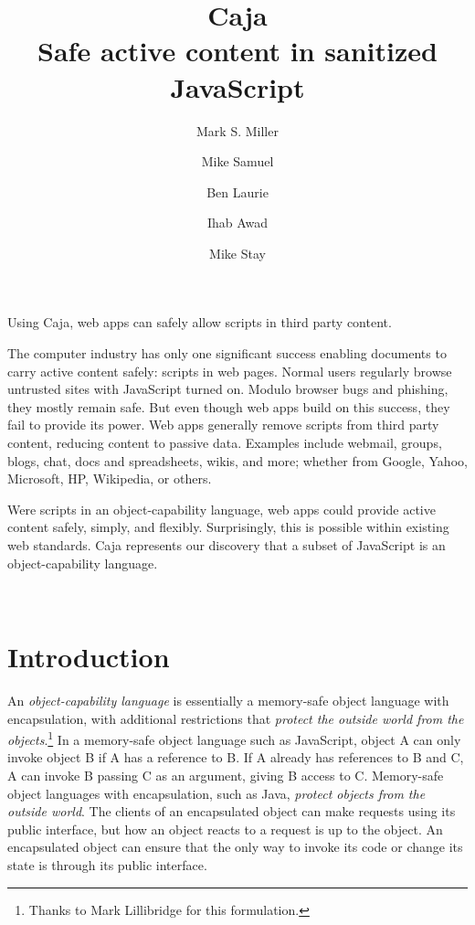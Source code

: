 \documentclass[letterpaper,twocolumn,10pt]{article}
\title{Caja\\
Safe active content in sanitized JavaScript}
\author{
        {\rm Mark S. Miller}
        \and 
        {\rm Mike Samuel}
        \and 
        {\rm Ben Laurie}
        \and 
        {\rm Ihab Awad}
        \and 
        {\rm Mike Stay}}
\begin{document}
\listoftodos

\maketitle


\abstract

Using Caja, web apps can safely allow scripts in third party content.

The computer industry has only one significant success enabling documents to 
carry active content safely: scripts in web pages. Normal users regularly 
browse untrusted sites with JavaScript turned on. Modulo browser bugs and 
phishing, they mostly remain safe. But even though web apps build on this 
success, they fail to provide its power. Web apps generally remove scripts 
from third party content, reducing content to passive data. Examples include 
webmail, groups, blogs, chat, docs and spreadsheets, wikis, and more; whether 
from Google, Yahoo, Microsoft, HP, Wikipedia, or others.

Were scripts in an object-capability language, web apps could provide active 
content safely, simply, and flexibly. Surprisingly, this is possible within 
existing web standards. Caja represents our discovery that a subset of 
JavaScript is an object-capability language.

\ \\

\section{Introduction}

An \emph{object-capability language} is essentially a memory-safe object 
language with encapsulation, with additional restrictions that \emph{protect 
the outside world from the objects}.\footnote{
%
Thanks to Mark Lillibridge for this formulation.
%
}  In a memory-safe object language such as JavaScript, object A can only invoke 
object B if A has a reference to B. If A already has references to B and C, A 
can invoke B passing C as an argument, giving B access to C. Memory-safe 
object languages with encapsulation, such as Java, \emph{protect objects from 
the outside world}. The clients of an encapsulated object can make requests 
using its public interface, but how an object reacts to a request is up to 
the object. An encapsulated object can ensure that the only way to invoke its 
code or change its state is through its public interface.
\end{document}
